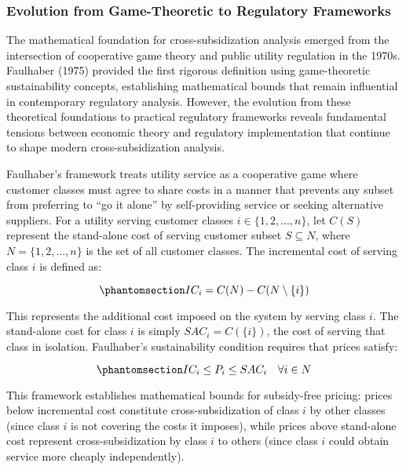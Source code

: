 \documentclass[
  11pt,
]{article}
\begin{document}
\subsubsection{Evolution from Game-Theoretic to Regulatory
Frameworks}\label{evolution-from-game-theoretic-to-regulatory-frameworks}

The mathematical foundation for cross-subsidization analysis emerged
from the intersection of cooperative game theory and public utility
regulation in the 1970s. Faulhaber (1975) provided the first rigorous
definition using game-theoretic sustainability concepts, establishing
mathematical bounds that remain influential in contemporary regulatory
analysis. However, the evolution from these theoretical foundations to
practical regulatory frameworks reveals fundamental tensions between
economic theory and regulatory implementation that continue to shape
modern cross-subsidization analysis.

Faulhaber's framework treats utility service as a cooperative game where
customer classes must agree to share costs in a manner that prevents any
subset from preferring to ``go it alone'' by self-providing service or
seeking alternative suppliers. For a utility serving customer classes
\(i \in \{1, 2, ..., n\}\), let \(C(S)\) represent the stand-alone cost
of serving customer subset \(S \subseteq N\), where
\(N = \{1, 2, ..., n\}\) is the set of all customer classes. The
incremental cost of serving class \(i\) is defined as:

\begin{equation}\phantomsection\label{eq-incremental}{IC_i = C(N) - C(N \setminus \{i\})}\end{equation}

This represents the additional cost imposed on the system by serving
class \(i\). The stand-alone cost for class \(i\) is simply
\(SAC_i = C(\{i\})\), the cost of serving that class in isolation.
Faulhaber's sustainability condition requires that prices satisfy:

\begin{equation}\phantomsection\label{eq-sustainability}{IC_i \leq P_i \leq SAC_i \quad \forall i \in N}\end{equation}

This framework establishes mathematical bounds for subsidy-free pricing:
prices below incremental cost constitute cross-subsidization of class
\(i\) by other classes (since class \(i\) is not covering the costs it
imposes), while prices above stand-alone cost represent
cross-subsidization by class \(i\) to others (since class \(i\) could
obtain service more cheaply independently).
\end{document}
